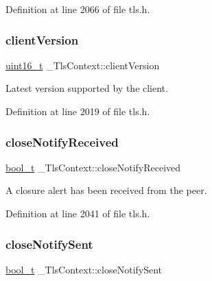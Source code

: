 Definition at line 2066 of file tls.\+h.

\mbox{\label{struct__TlsContext_a6e780a4b6023b1ee78049228aca2a392}} 
\subsubsection{\texorpdfstring{client\+Version}{clientVersion}}
{\footnotesize\ttfamily \hyperlink{stdint_8h_a273cf69d639a59973b6019625df33e30}{uint16\+\_\+t} \+\_\+\+Tls\+Context\+::client\+Version}



Latest version supported by the client. 



Definition at line 2019 of file tls.\+h.

\mbox{\label{struct__TlsContext_a7e0c52a9f91c03d5bc44270e4092efea}} 
\subsubsection{\texorpdfstring{close\+Notify\+Received}{closeNotifyReceived}}
{\footnotesize\ttfamily \hyperlink{compiler__port_8h_a812d16e5494522586b3784e55d479912}{bool\+\_\+t} \+\_\+\+Tls\+Context\+::close\+Notify\+Received}



A closure alert has been received from the peer. 



Definition at line 2041 of file tls.\+h.

\mbox{\label{struct__TlsContext_ac84f53bec72e0ba48ab25ca9fd28bcd8}} 
\subsubsection{\texorpdfstring{close\+Notify\+Sent}{closeNotifySent}}
{\footnotesize\ttfamily \hyperlink{compiler__port_8h_a812d16e5494522586b3784e55d479912}{bool\+\_\+t} \+\_\+\+Tls\+Context\+::close\+Notify\+Sent}



